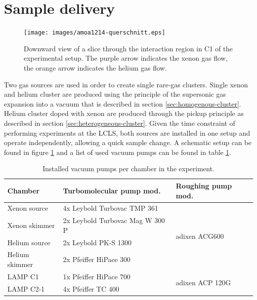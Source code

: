 \section{Sample delivery}\label{sec:sample-delivery}
\begin{figure}
	\centering
		\texttt{[image: images/amoa1214-querschnitt.eps]}
	\caption[Sideview of double sample jet configuration.]{Downward view of a slice through the interaction region in C1 of the experimental setup. The purple arrow indicates the xenon gas flow, the orange arrow indicates the helium gas flow.}
	\label{fig:Overview-Jetalignment}
\end{figure}
Two gas sources are used in order to create single rare-gas clusters. Single xenon and helium cluster are produced using the principle of the supersonic gas expansion into a vacuum that is described in section \ref{sec:homogenous-cluster}. Helium cluster doped with xenon are produced through the pickup principle as described in section \ref{sec:heterogeneous-cluster}. Given the time constraint of performing experiments at the LCLS, both sources are installed in one setup and operate independently, allowing a quick sample change. A schematic setup can be found in figure \ref{fig:Overview-Jetalignment} and a list of used vacuum pumps can be found in table \ref{tab:vacuum-table}.\\
\begin{table}
	\centering
\begin{tabular}{ | l | l | l | }
\hline
	\textbf{Chamber} & \textbf{Turbomolecular pump mod.} & \textbf{Roughing pump mod.} \\ \hline
	Xenon source & 4x Leybold Turbovac TMP 361 & \multirow{4}{*}{adixen ACG600} \\ 
	Xenon skimmer & 2x Leybold Turbovac Mag W 300 P &  \\ 
	Helium source & 2x Leybold PK-S 1300 & \\ 
	Helium skimmer & 2x Pfeiffer HiPace 300 & \\ \hline
	LAMP C1 & 1x Pfeiffer HiPace 700 & \multirow{2}{*}{adixen ACP 120G} \\ 
	LAMP C2-1 & 4x Pfeiffer TC 400 & \\ \hline
\end{tabular}
\caption[Installed vacuum pumps in the experiment.]{Installed vacuum pumps per chamber in the experiment.}
\label{tab:vacuum-table}
\end{table}
